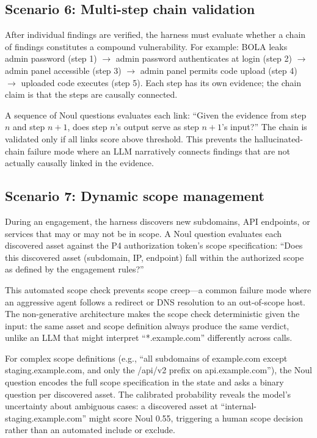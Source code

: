 \documentclass[conference]{IEEEtran}
\begin{document}
\subsection{Scenario 6: Multi-step chain validation}

After individual findings are verified, the harness must evaluate whether a chain of findings constitutes a compound vulnerability. For example: BOLA leaks admin password (step 1) $\rightarrow$ admin password authenticates at login (step 2) $\rightarrow$ admin panel accessible (step 3) $\rightarrow$ admin panel permits code upload (step 4) $\rightarrow$ uploaded code executes (step 5). Each step has its own evidence; the chain claim is that the steps are causally connected.

A sequence of Noul questions evaluates each link: ``Given the evidence from step $n$ and step $n+1$, does step $n$'s output serve as step $n+1$'s input?'' The chain is validated only if all links score above threshold. This prevents the hallucinated-chain failure mode where an LLM narratively connects findings that are not actually causally linked in the evidence.

\subsection{Scenario 7: Dynamic scope management}

During an engagement, the harness discovers new subdomains, API endpoints, or services that may or may not be in scope. A Noul question evaluates each discovered asset against the P4 authorization token's scope specification: ``Does this discovered asset (subdomain, IP, endpoint) fall within the authorized scope as defined by the engagement rules?''

This automated scope check prevents scope creep---a common failure mode where an aggressive agent follows a redirect or DNS resolution to an out-of-scope host. The non-generative architecture makes the scope check deterministic given the input: the same asset and scope definition always produce the same verdict, unlike an LLM that might interpret ``*.example.com'' differently across calls.

For complex scope definitions (e.g., ``all subdomains of example.com except staging.example.com, and only the /api/v2 prefix on api.example.com''), the Noul question encodes the full scope specification in the state and asks a binary question per discovered asset. The calibrated probability reveals the model's uncertainty about ambiguous cases: a discovered asset at ``internal-staging.example.com'' might score Noul 0.55, triggering a human scope decision rather than an automated include or exclude.
\end{document}
